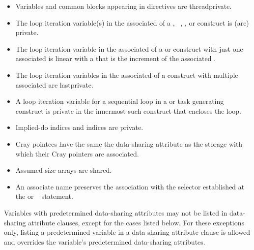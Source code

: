 \begin{fortranspecific}
\begin{itemize}
\item Variables and common blocks appearing in  directives are
threadprivate.

\item The loop iteration variable(s) in the associated  of a
  , ~,
, or  construct is (are) private.

\item The loop iteration variable in the associated  of a
   or   construct with just
one associated  is linear with a  that is the increment of
the associated .

\item The loop iteration variables in the associated  of a  construct with
multiple associated  are lastprivate.

\item A loop iteration variable for a sequential loop in a  or task generating construct is
private in the innermost such construct that encloses the loop.

\item Implied-do indices and  indices are private.

\item Cray pointees have the same the data-sharing attribute as the storage with which their Cray
pointers are associated.

\item Assumed-size arrays are shared.
\nopagebreak
\item An associate name preserves the association with the selector established at the
 or ~ statement.
\end{itemize}
\end{fortranspecific}
%
Variables with predetermined data-sharing attributes may not be listed in data-sharing
attribute clauses, except for the cases listed below. For these exceptions only, listing a
predetermined variable in a data-sharing attribute clause is allowed and overrides the
variable's predetermined data-sharing attributes.
%

